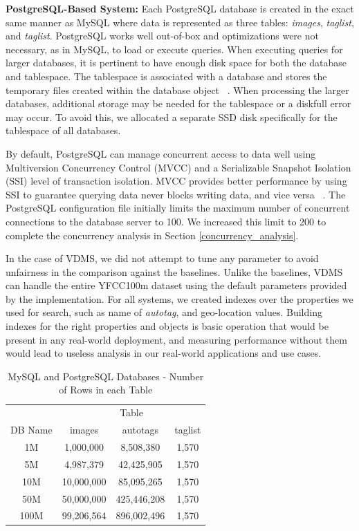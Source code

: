 \textbf{PostgreSQL-Based System:}
Each PostgreSQL database is created in the exact same manner as MySQL
where data is represented as three tables:
\textit{images}, \textit{taglist}, and \textit{taglist}.
PostgreSQL works well out-of-box and optimizations were not necessary,
as in MySQL, to load or execute queries.
When executing queries for larger databases,
it is pertinent to have enough disk space for both
the database and tablespace.
The tablespace is associated with a database and stores the temporary files
created within the database object ~\cite{postgresql}.
When processing the larger databases, additional
storage may be needed for the tablespace or a diskfull error may occur.
To avoid this, we allocated a separate SSD disk specifically
for the tablespace of all databases.

By default, PostgreSQL can manage concurrent access to data well using
Multiversion Concurrency Control (MVCC) and a Serializable Snapshot Isolation
(SSI) level of transaction isolation.
MVCC provides better performance by using SSI to guarantee querying data never
blocks writing data, and vice versa ~\cite{postgresql}.
The PostgreSQL configuration file initially limits the maximum
number of concurrent connections to the database server to 100.
We increased this limit to 200 to complete the concurrency analysis
in Section \ref{concurrency_analysis}.

In the case of VDMS, we did not attempt to tune any
parameter to avoid unfairness in the comparison against the baselines.
Unlike the baselines, VDMS can handle the entire YFCC100m dataset
using the default parameters provided by the implementation.
For all systems, we created indexes over the
properties we used for search, such as name of
\textit{autotag}, and geo-location values.
Building indexes for the right properties and objects
is basic operation that would be present in any real-world deployment,
and measuring performance without them would lead to useless analysis in our
real-world applications and use cases.

\begin{table}[ht]
\caption{MySQL and PostgreSQL Databases - Number of Rows in each Table}
\centering
\begin{tabular}{c c c c}
\hline\hline
 & \multicolumn{3}{c}{Table}\\
\cline{2-4}
DB Name & images & autotags & taglist\\
\hline
1M   & 1,000,000  & 8,508,380   & 1,570\\
5M   & 4,987,379  & 42,425,905  & 1,570\\
10M  & 10,000,000 & 85,095,265  & 1,570\\
50M  & 50,000,000 & 425,446,208 & 1,570\\
100M & 99,206,564 & 896,002,496 & 1,570\\
\hline
\end{tabular}
\label{table:mysqltables}
\end{table}

